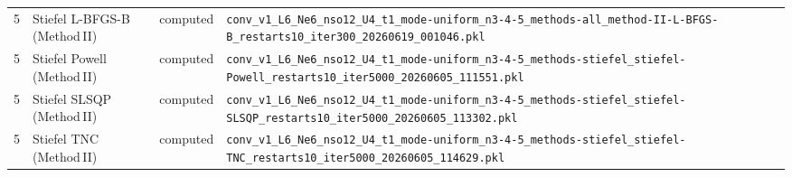 \begin{tabular}{c l l l}
5 & Stiefel L-BFGS-B (Method\,II) & computed & {\scriptsize\texttt{conv\_v1\_L6\_Ne6\_nso12\_U4\_t1\_mode-uniform\_n3-4-5\_methods-all\_method-II-L-BFGS-B\_restarts10\_iter300\_20260619\_001046.pkl}} \\
5 & Stiefel Powell (Method\,II) & computed & {\scriptsize\texttt{conv\_v1\_L6\_Ne6\_nso12\_U4\_t1\_mode-uniform\_n3-4-5\_methods-stiefel\_stiefel-Powell\_restarts10\_iter5000\_20260605\_111551.pkl}} \\
5 & Stiefel SLSQP (Method\,II) & computed & {\scriptsize\texttt{conv\_v1\_L6\_Ne6\_nso12\_U4\_t1\_mode-uniform\_n3-4-5\_methods-stiefel\_stiefel-SLSQP\_restarts10\_iter5000\_20260605\_113302.pkl}} \\
5 & Stiefel TNC (Method\,II) & computed & {\scriptsize\texttt{conv\_v1\_L6\_Ne6\_nso12\_U4\_t1\_mode-uniform\_n3-4-5\_methods-stiefel\_stiefel-TNC\_restarts10\_iter5000\_20260605\_114629.pkl}} \\
\bottomrule
\end{tabular}
